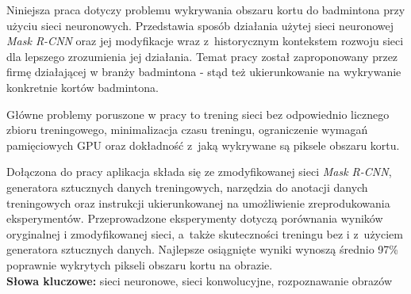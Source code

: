 Niniejsza praca dotyczy problemu wykrywania obszaru kortu do badmintona przy użyciu sieci neuronowych.
Przedstawia sposób działania użytej sieci neuronowej \textit{Mask R-CNN} \cite{general-mask-rcnn} oraz jej modyfikacje wraz z~historycznym kontekstem rozwoju sieci dla lepszego zrozumienia jej działania.
Temat pracy został zaproponowany przez firmę \blue{} działającej w branży badmintona - stąd też ukierunkowanie na wykrywanie konkretnie kortów badmintona.

Główne problemy poruszone w pracy to trening sieci bez odpowiednio licznego zbioru treningowego, minimalizacja czasu treningu, ograniczenie wymagań pamięciowych GPU oraz dokładność z~jaką wykrywane są piksele obszaru kortu.

Dołączona do pracy aplikacja składa się ze zmodyfikowanej sieci \textit{Mask R-CNN}, generatora sztucznych danych treningowych, narzędzia do anotacji danych treningowych oraz instrukcji ukierunkowanej na umożliwienie zreprodukowania eksperymentów.
Przeprowadzone eksperymenty dotyczą porównania wyników oryginalnej i zmodyfikowanej sieci, a~także skuteczności treningu bez i z~użyciem generatora sztucznych danych.
Najlepsze osiągnięte wyniki wynoszą średnio 97\% poprawnie wykrytych pikseli obszaru kortu na obrazie.
\\

\noindent \textbf{Słowa kluczowe:} sieci neuronowe, sieci konwolucyjne, rozpoznawanie obrazów
